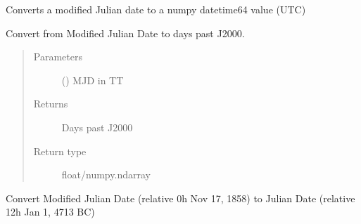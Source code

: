 \documentclass[letterpaper,10pt,english]{sphinxmanual}
\begin{document}

\begin{fulllineitems}
\label{\detokenize{modules/dpt_tools:dpt_tools.mjd2npdt}}
Converts a modified Julian date to a numpy datetime64 value (UTC)

\end{fulllineitems}


\begin{fulllineitems}
\label{\detokenize{modules/dpt_tools:dpt_tools.mjd_to_j2000}}
Convert from Modified Julian Date to days past J2000.
\begin{quote}\begin{description}
\item[{Parameters}] \leavevmode
{} () \textendash{} MJD in TT

\item[{Returns}] \leavevmode
Days past J2000

\item[{Return type}] \leavevmode
float/numpy.ndarray

\end{description}\end{quote}

\end{fulllineitems}


\begin{fulllineitems}
\label{\detokenize{modules/dpt_tools:dpt_tools.mjd_to_jd}}
Convert Modified Julian Date (relative 0h Nov 17, 1858) to Julian Date (relative 12h Jan 1, 4713 BC)

\end{fulllineitems}

\end{document}

